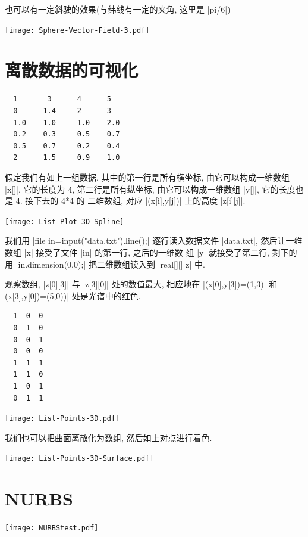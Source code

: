 \documentclass[nofonts,CJKnormalspaces]{ctexbook}[2009/05/20]
\begin{document}
也可以有一定斜驶的效果(与纬线有一定的夹角, 这里是 |pi/6|)
\begin{center}\texttt{[image: Sphere-Vector-Field-3.pdf]}\end{center}%

\section{离散数据的可视化}
\begin{lstlisting}
  1       3      4      5
  0      1.4     2      3
  1.0    1.0     1.0    2.0
  0.2    0.3     0.5    0.7
  0.5    0.7     0.2    0.4
  2      1.5     0.9    1.0
\end{lstlisting}
假定我们有如上一组数据, 其中的第一行是所有横坐标, 由它可以构成一维数组
|x[]|, 它的长度为 4, 第二行是所有纵坐标, 由它可以构成一维数组 |y[]|,
它的长度也是 4. 接下去的 4*4 的 二维数组, 对应 |(x[i],y[j])| 上的高度
|z[i][j]|.
\begin{center}\texttt{[image: List-Plot-3D-Spline]}\end{center}%

我们用 |file in=input("data.txt").line();| 逐行读入数据文件
|data.txt|, 然后让一维数组 |x| 接受了文件 |in| 的第一行, 之后的一维数
组 |y| 就接受了第二行, 剩下的用 |in.dimension(0,0);| 把二维数组读入到
|real[][] z| 中.

观察数组, |z[0][3]| 与 |z[3][0]| 处的数值最大, 相应地在
|(x[0],y[3])=(1,3)| 和 |(x[3],y[0])=(5,0))| 处是光谱中的红色.

\begin{lstlisting}
  1  0  0
  0  1  0
  0  0  1
  0  0  0
  1  1  1
  1  1  0
  1  0  1
  0  1  1
\end{lstlisting}

\begin{center}\texttt{[image: List-Points-3D.pdf]}\end{center}%


我们也可以把曲面离散化为数组, 然后如上对点进行着色.
\begin{center}\texttt{[image: List-Points-3D-Surface.pdf]}\end{center}%


\section{NURBS}
\begin{center}\texttt{[image: NURBStest.pdf]}\end{center}%

\end{document}
